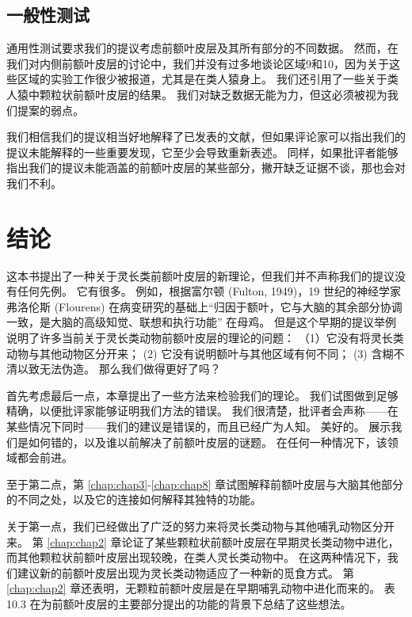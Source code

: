 \subsection{一般性测试}

通用性测试要求我们的提议考虑前额叶皮层及其所有部分的不同数据。
然而，在我们对内侧前额叶皮层的讨论中，我们并没有过多地谈论区域9和10，因为关于这些区域的实验工作很少被报道，尤其是在类人猿身上。
我们还引用了一些关于类人猿中颗粒状前额叶皮层的结果。
我们对缺乏数据无能为力，但这必须被视为我们提案的弱点。
\par


我们相信我们的提议相当好地解释了已发表的文献，但如果评论家可以指出我们的提议未能解释的一些重要发现，它至少会导致重新表述。
同样，如果批评者能够指出我们的提议未能涵盖的前额叶皮层的某些部分，撇开缺乏证据不谈，那也会对我们不利。



\section{结论}

这本书提出了一种关于灵长类前额叶皮层的新理论，但我们并不声称我们的提议没有任何先例。 
它有很多。
例如，根据富尔顿 (Fulton, 1949)，19 世纪的神经学家弗洛伦斯 (Flourens) 在病变研究的基础上“归因于额叶，它与大脑的其余部分协调一致，是大脑的高级知觉、联想和执行功能” 在母鸡。
但是这个早期的提议举例说明了许多当前关于灵长类动物前额叶皮层的理论的问题：
（1）它没有将灵长类动物与其他动物区分开来； 
(2) 它没有说明额叶与其他区域有何不同； 
(3) 含糊不清以致无法伪造。 那么我们做得更好了吗？
\par


首先考虑最后一点，本章提出了一些方法来检验我们的理论。
我们试图做到足够精确，以便批评家能够证明我们方法的错误。 
我们很清楚，批评者会声称——在某些情况下同时——我们的建议是错误的，而且已经广为人知。 美好的。 
展示我们是如何错的，以及谁以前解决了前额叶皮层的谜题。 
在任何一种情况下，该领域都会前进。
\par


至于第二点，第 \ref{chap:chap3}-\ref{chap:chap8} 章试图解释前额叶皮层与大脑其他部分的不同之处，以及它的连接如何解释其独特的功能。
\par


关于第一点，我们已经做出了广泛的努力来将灵长类动物与其他哺乳动物区分开来。
第 \ref{chap:chap2} 章论证了某些颗粒状前额叶皮层在早期灵长类动物中进化，而其他颗粒状前额叶皮层出现较晚，在类人灵长类动物中。
在这两种情况下，我们建议新的前额叶皮层出现为灵长类动物适应了一种新的觅食方式。
第 \ref{chap:chap2} 章还表明，无颗粒前额叶皮层是在早期哺乳动物中进化而来的。
表 10.3 在为前额叶皮层的主要部分提出的功能的背景下总结了这些想法。
\par


